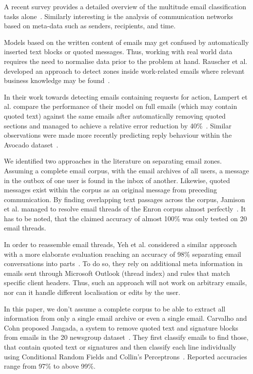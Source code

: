 \documentclass{llncs}
\begin{document}
A recent survey provides a detailed overview of the multitude email classification tasks alone~\cite{classification}.
Similarly interesting is the analysis of communication networks based on meta-data such as senders, recipients, and time.

Models based on the written content of emails may get confused by automatically inserted text blocks or quoted messages.
Thus, working with real world data requires the need to normalise data prior to the problem at hand.
Rauscher et al. developed an approach to detect zones inside work-related emails where relevant business knowledge may be found~\cite{rauscher2015context}.

In their work towards detecting emails containing requests for action, Lampert et al. compare the performance of their model on full emails (which may contain quoted text) against the same emails after automatically removing quoted sections and managed to achieve a relative error reduction by 40\%~\cite{rfa}.
Similar observations were made more recently predicting reply behaviour within the Avocado dataset~\cite{replying}.

We identified two approaches in the literature on separating email zones.
Assuming a complete email corpus, with the email archives of all users, a message in the outbox of one user is found in the inbox of another.
Likewise, quoted messages exist within the corpus as an original message from preceding communication.
By finding overlapping text passages across the corpus, Jamison et al. managed to resolve email threads of the Enron corpus almost perfectly~\cite{headerless}.
It has to be noted, that the claimed accuracy of almost 100\% was only tested on 20 email threads.

In order to reassemble email threads, Yeh et al. considered a similar approach with a more elaborate evaluation reaching an accuracy of 98\% separating email conversations into parts~\cite{similarity}.
To do so, they rely on additional meta information in emails sent through Microsoft Outlook (thread index) and rules that match specific client headers.
Thus, such an approach will not work on arbitrary emails, nor can it handle different localisation or edits by the user.

In this paper, we don't assume a complete corpus to be able to extract all information from only a single email archive or even a single email.
Carvalho and Cohn proposed Jangada, a system to remove quoted text and signature blocks from emails in the 20 newsgroup dataset~\cite{signature,20news}.
They first classify emails to find those, that contain quoted text or signatures and then classify each line individually using Conditional Random Fields and Collin's Perceptrons~\cite{crf, cperceptron}.
Reported accuracies range from 97\% to above 99\%.
\end{document}
